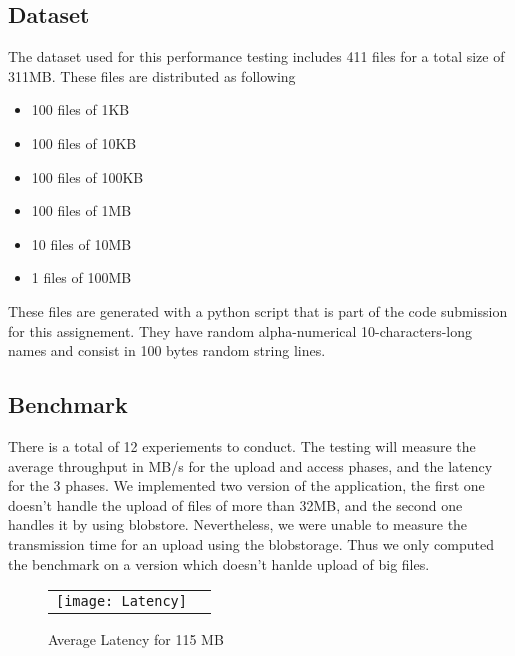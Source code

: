 \documentclass{article}
\begin{document}
\subsection{Dataset}

The dataset used for this performance testing includes 411 files for a total size of 311MB. These files are distributed as following

\begin{itemize}

\item 100 files of 1KB

\item 100 files of 10KB

\item 100 files of 100KB

\item 100 files of 1MB

\item 10 files of 10MB

\item 1 files of 100MB\\

\end{itemize}

These files are generated with a python script that is part of the code submission for this assignement. They have random alpha-numerical 10-characters-long names and consist in 100 bytes random string lines.



\subsection{Benchmark}

There is a total of 12 experiements to conduct. The testing will measure the average throughput in MB/s for the upload and access phases, and the latency for the 3 phases. We implemented two version of the application, the first one doesn't handle the upload of files of more than 32MB, and the second one handles it by using blobstore. Nevertheless, we were unable to measure the transmission time for an upload using the blobstorage. Thus we only computed the benchmark on a version which doesn't hanlde upload of big files.

\begin{figure}[!ht]
\centering
\begin{tabular}{cc}
\texttt{[image: Latency]}
\end{tabular}
\caption{Average Latency for 115 MB}
\end{figure}
\end{document}
